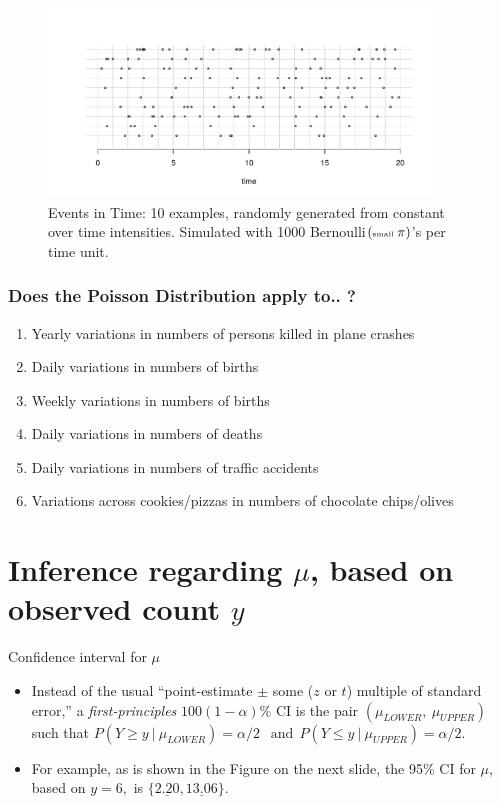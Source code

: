 \documentclass{beamer}\usepackage[]{graphicx}\usepackage[]{color}
\begin{document}
\begin{frame}
\frametitle{}
\begin{figure}[h]
	\begin{center}
		\includegraphics[width=4in,height=2in]{timeStrips63.pdf}
		\caption{Events in Time: 10 examples, randomly generated from constant over time intensities. Simulated with 1000 Bernoulli$(\tiny{\textrm{small }\pi})$'s per time unit.}
	\end{center}
\end{figure}
\end{frame}


\begin{frame}
\frametitle{Does the Poisson Distribution apply to.. ?}

\begin{enumerate}
	\setlength\itemsep{0.9em}
		\item Yearly variations in numbers of persons killed in	plane crashes 
		\item Daily variations in numbers of births
		\item Weekly variations in numbers of births
		\item Daily variations in numbers of deaths
		\item Daily variations in numbers of traffic accidents
		\item Variations across cookies/pizzas in numbers of chocolate chips/olives
\end{enumerate}
\end{frame}




\section{Inference regarding $\mu$, based on observed count $y$}

\begin{frame}{Confidence interval for $\mu$}
\begin{itemize}
		\setlength\itemsep{2em}
	\item Instead of the usual ``point-estimate $\pm$ some ($z$ or $t$) multiple of standard error,''
a \textit{first-principles} $100(1-\alpha)\%$ CI is the pair $(\mu_{LOWER},\: \mu_{UPPER})$ such that  
$P(Y \ge y \: | \: \mu_{LOWER}) = \alpha/2 \:\: \textrm{ and} \:\:  P(Y \le y \: | \: \mu_{UPPER}) = \alpha/2.$
\item For example, as is shown in the Figure on the next slide, the  95\% CI for $\mu$, based on $y=6,$ is  $\{\underline{2.20}, \underline{13.06}\}.$ 
\end{itemize}


\end{frame}
\end{document}
